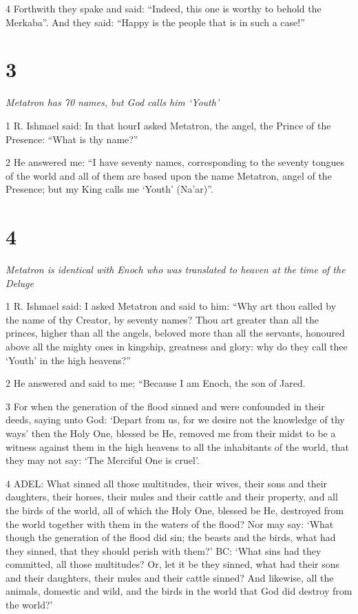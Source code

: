 \par 4 Forthwith they spake and said: “Indeed, this one is worthy to behold the Merkaba”. And they said: “Happy is the people that is in such a case!”

\chapter{3}

\par \textit{Metatron has 70 names, but God calls him ‘Youth’}

\par 1 R. Ishmael said: In that hourI asked Metatron, the angel, the Prince of the Presence: “What is thy name?” 

\par 2 He answered me: “I have seventy names, corresponding to the seventy tongues of the world and all of them are based upon the name Metatron, angel of the Presence; but my King calls me ‘Youth’ (Na'ar)”.

\chapter{4}

\par \textit{Metatron is identical with Enoch who was translated to heaven at the time of the Deluge}

\par 1 R. Ishmael said: I asked Metatron and said to him: “Why art thou called by the name of thy Creator, by seventy names? Thou art greater than all the princes, higher than all the angels, beloved more than all the servants, honoured above all the mighty ones in kingship, greatness and glory: why do they call thee ‘Youth’ in the high heavens?”

\par 2 He answered and said to me; “Because I am Enoch, the son of Jared.

\par 3 For when the generation of the flood sinned and were confounded in their deeds, saying unto God: ‘Depart from us, for we desire not the knowledge of thy ways’ then the Holy One, blessed be He, removed me from their midst to be a witness against them in the high heavens to all the inhabitants of the world, that they may not say: ‘The Merciful One is cruel’. 

\par 4 ADEL: What sinned all those multitudes, their wives, their sons and their daughters, their horses, their mules and their cattle and their property, and all the birds of the world, all of which the Holy One, blessed be He, destroyed from the world together with them in the waters of the flood? Nor may say: ‘What though the generation of the flood did sin; the beasts and the birds, what had they sinned, that they should perish with them?’ BC: ‘What sins had they committed, all those multitudes? Or, let it be they sinned, what had their sons and their daughters, their mules and their cattle sinned? And likewise, all the animals, domestic and wild, and the birds in the world that God did destroy from the world?’


